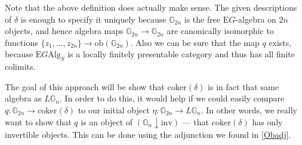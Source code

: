 Note that the above definition does actually make sense. The given descriptions of $\delta$ is enough to specify it uniquely because $\mathbb{G}_{2n}$ is the free $\mathrm{E}G$-algebra on $2n$ objects, and hence algebra maps $\mathbb{G}_{2n} \to \mathbb{G}_{2n}$ are canonically isomorphic to functions $\{z_1, ..., z_{2n}\} \to \mathrm{ob}(\mathbb{G}_{2n})$. Also we can be sure that the map $q$ exists, because $\mathrm{E}G\mathrm{Alg}_S$ is a locally finitely presentable category and thus has all finite colimits.

The goal of this approach will be show that $\mathrm{coker}(\delta)$ is in fact that same algebra as $L\mathbb{G}_n$. In order to do this, it would help if we could easily compare $q: \mathbb{G}_{2n} \to \mathrm{coker}(\delta)$ to our initial object $\eta: \mathbb{G}_{2n} \to L\mathbb{G}_n$. In other words, we really want to show that $q$ is an object of $(\mathbb{G}_n \downarrow \mathrm{inv})$ --- that $\mathrm{coker}(\delta)$ has only invertible objects. This can be done using the adjunction we found in \cref{Obadj}.

